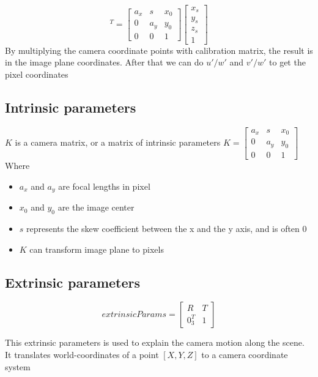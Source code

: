 \documentclass[a4paper, twoside, english]{article}
\begin{document}
\begin{equation*}
[u',v',w']^T =\begin{bmatrix}
a_x & s & x_0  \\
0 & a_y & y_0 \\
0 & 0 & 1
\end{bmatrix}
\begin{bmatrix}
x_s \\
y_s \\
z_s \\
1
\end{bmatrix}
\end{equation*}
By multiplying the camera coordinate points with calibration matrix, the result is in the image plane coordinates. After that we can do $u'/w'$ and $v'/w'$ to get the pixel coordinates

\subsection{Intrinsic parameters}

$K$ is a camera matrix, or a matrix of intrinsic parameters $K=\begin{bmatrix}
a_x & s & x_0  \\
0 & a_y & y_0 \\
0 & 0 & 1
\end{bmatrix}$ 
Where \begin{itemize}
	\item $a_x$ and $a_y$ are focal lengths in pixel 
	\item $x_0$ and $y_0$ are the image center
	\item $s$ represents the skew coefficient between the x and the y axis, and is often 0 \cite{CameraResectioning}\cite{OpenCVDocCameraCalib}
	\item $K$ can transform image plane to pixels
\end{itemize}



\subsection{Extrinsic parameters}
\begin{equation*} extrinsicParams = 
\begin{bmatrix}
R & T \\
0_3^T & 1
\end{bmatrix}
\end{equation*}

This extrinsic parameters is used to explain the camera motion along the scene. It translates world-coordinates of a point $[X,Y,Z]$ to a camera coordinate system
\end{document}
